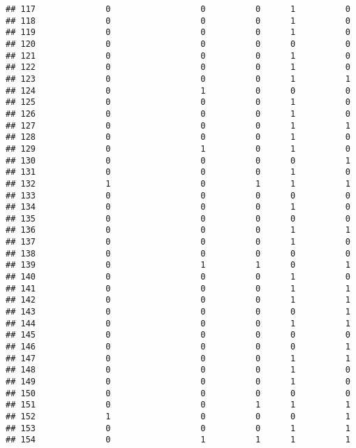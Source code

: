 \documentclass[
]{article}
\begin{document}
\begin{verbatim}
## 117              0                  0          0      1          0
## 118              0                  0          0      1          0
## 119              0                  0          0      1          0
## 120              0                  0          0      0          0
## 121              0                  0          0      1          0
## 122              0                  0          0      1          0
## 123              0                  0          0      1          1
## 124              0                  1          0      0          0
## 125              0                  0          0      1          0
## 126              0                  0          0      1          0
## 127              0                  0          0      1          1
## 128              0                  0          0      1          0
## 129              0                  1          0      1          0
## 130              0                  0          0      0          1
## 131              0                  0          0      1          0
## 132              1                  0          1      1          1
## 133              0                  0          0      0          0
## 134              0                  0          0      1          0
## 135              0                  0          0      0          0
## 136              0                  0          0      1          1
## 137              0                  0          0      1          0
## 138              0                  0          0      0          0
## 139              0                  1          1      0          1
## 140              0                  0          0      1          0
## 141              0                  0          0      1          1
## 142              0                  0          0      1          1
## 143              0                  0          0      0          1
## 144              0                  0          0      1          1
## 145              0                  0          0      0          0
## 146              0                  0          0      0          1
## 147              0                  0          0      1          1
## 148              0                  0          0      1          0
## 149              0                  0          0      1          0
## 150              0                  0          0      0          0
## 151              0                  0          1      1          1
## 152              1                  0          0      0          1
## 153              0                  0          0      1          1
## 154              0                  1          1      1          1

\end{verbatim}
\end{document}
